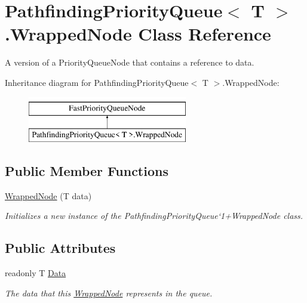 \hypertarget{class_pathfinding_priority_queue_1_1_wrapped_node}{}\section{Pathfinding\+Priority\+Queue$<$ T $>$.Wrapped\+Node Class Reference}
\label{class_pathfinding_priority_queue_1_1_wrapped_node}


A version of a Priority\+Queue\+Node that contains a reference to data.  


Inheritance diagram for Pathfinding\+Priority\+Queue$<$ T $>$.Wrapped\+Node\+:\begin{figure}[H]
\begin{center}
\leavevmode
\includegraphics[height=2.000000cm]{class_pathfinding_priority_queue_1_1_wrapped_node}
\end{center}
\end{figure}
\subsection*{Public Member Functions}
\begin{DoxyCompactItemize}
\item 
\hyperlink{class_pathfinding_priority_queue_1_1_wrapped_node_a86d458e9916da5b8ba8c09ea9fffd7fa}{Wrapped\+Node} (T data)
\begin{DoxyCompactList}\small\item\em Initializes a new instance of the Pathfinding\+Priority\+Queue`1+\+Wrapped\+Node class. \end{DoxyCompactList}\end{DoxyCompactItemize}
\subsection*{Public Attributes}
\begin{DoxyCompactItemize}
\item 
readonly T \hyperlink{class_pathfinding_priority_queue_1_1_wrapped_node_aaa8b05f20c6fe44fced52c5c525051cb}{Data}
\begin{DoxyCompactList}\small\item\em The data that this \hyperlink{class_pathfinding_priority_queue_1_1_wrapped_node}{Wrapped\+Node} represents in the queue. \end{DoxyCompactList}\end{DoxyCompactItemize}


